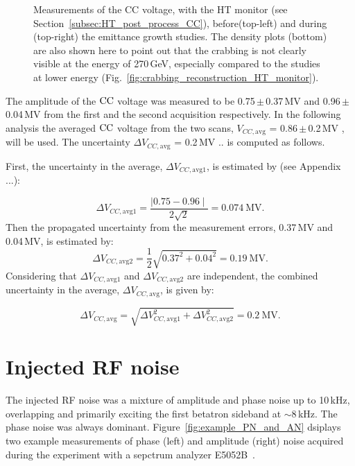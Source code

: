 \begin{figure}[!ht]
\begin{subfigure}[t]{0.45\textwidth}
    \end{subfigure}
    \hfill
     \caption{Measurements of the CC voltage, with the HT monitor (see Section~\ref{subsec:HT_post_process_CC}), before(top-left) and during (top-right) the emittance growth studies. The density plots (bottom) are also shown here to point out that the crabbing is not clearly visible at the energy of 270\,GeV, especially compared to the studies at lower energy (Fig.~\ref{fig:crabbing_reconstruction_HT_monitor}).}
     \label{fig:VCC_MD5_2018} 
\end{figure}

\begin{sloppypar}
The amplitude of the ${\mathrm{CC}}$ voltage was measured to be 0.75\,$\pm$\,0.37\,MV and 0.96\,$\pm$\,0.04\,MV from the first and the second acquisition respectively. In the following analysis the averaged ${\mathrm{CC}}$ voltage from the two scans, $V_{CC, \mathrm{avg}}$ = 0.86\,$\pm$\,0.2\,MV , will be used. The uncertainty  $\Delta V_{CC, \mathrm{avg}}$ = 0.2\,MV .. is computed as follows. 

First, the uncertainty in the average, $\Delta V_{CC, \mathrm{avg1}}$, is estimated by (see Appendix ...): 
\end{sloppypar}
\begin{equation}\label{eq:uncertainty_mean_ws}
    \Delta V_{CC, \mathrm{avg1}} = \frac{\mid 0.75 - 0.96 \mid}{2 \sqrt{2}}=0.074\mathrm{\ MV}.
\end{equation}
Then the propagated uncertainty from the measurement errors, 0.37\,MV and 0.04\,MV, is estimated by:
\begin{equation}\label{eq:propagated_uncertainty_ws}
    \Delta V_{CC, \mathrm{avg2}} = \frac{1}{2}\sqrt{ 0.37^2 + 0.04^2} = 0.19\mathrm{\ MV}.
\end{equation}
Considering that $\Delta V_{CC, \mathrm{avg1}}$ and $\Delta V_{CC, \mathrm{avg2}}$ are independent, the combined uncertainty in the average, $\Delta V_{CC, \mathrm{avg}}$, is given by:

\begin{equation}\label{eq:combined_uncertainty_ws}
    \Delta V_{CC, \mathrm{avg}} = \sqrt{\Delta V_{CC, \mathrm{avg1}} ^2 + \Delta V_{CC, \mathrm{avg2}} ^2}=0.2\mathrm{\ MV}.
\end{equation}


\section{Injected RF noise}\label{sec:noise_meas2018}
\begin{sloppypar} %
 The injected RF noise was a mixture of amplitude and phase noise up to 10\,kHz, overlapping and primarily exciting the first betatron sideband at $\sim 8$\,kHz. The phase noise was always dominant. Figure~\ref{fig:example_PN_and_AN} dsiplays two example measurements of phase (left) and amplitude (right) noise acquired during the experiment with a sepctrum analyzer E5052B~\cite{E5052B_insight}. 
\end{sloppypar} 

